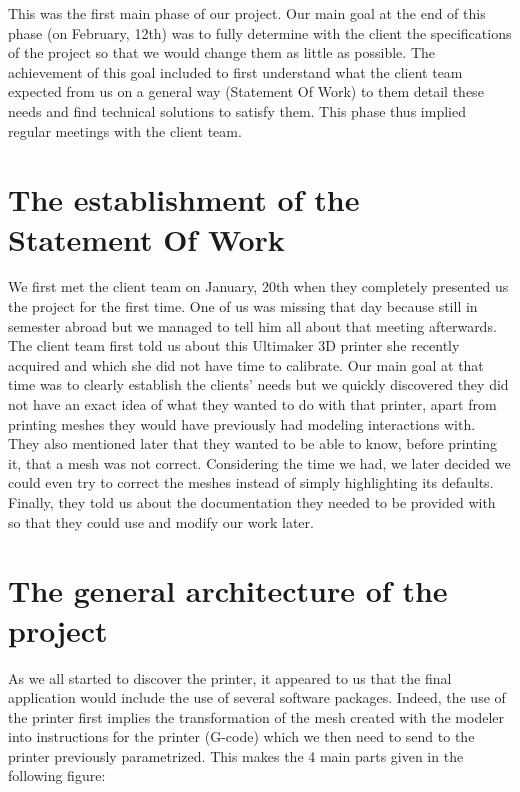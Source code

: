 \documentclass{report}
\begin{document}
This was the first main phase of our project. Our main goal at the end of this phase (on February, 12th) was to fully determine with the client the specifications of the project so that we would change them as little as possible. The achievement of this goal included to first understand what the client team expected from us on a general way (Statement Of Work) to them detail these needs and find technical solutions to satisfy them. This phase thus implied regular meetings with the client team.

\section{The establishment of the Statement Of Work}

We first met the client team on January, 20th when they completely presented us the project for the first time. One of us was missing that day because still in semester abroad but we managed to tell him all about that meeting afterwards.\\

The client team first told us about this Ultimaker 3D printer she recently acquired and which she did not have time to calibrate. Our main goal at that time was to clearly establish the clients' needs but we quickly discovered they did not have an exact idea of what they wanted to do with that printer, apart from printing meshes they would have previously had modeling interactions with.\\

They also mentioned later that they wanted to be able to know, before printing it, that a mesh was not correct. Considering the time we had, we later decided we could even try to correct the meshes instead of simply highlighting its defaults. \\

Finally, they told us about the documentation they needed to be provided with so that they could use and modify our work later. \\

\section{The general architecture of the project}

As we all started to discover the printer, it appeared to us that the final application would include the use of several software packages. Indeed, the use of the printer first implies the transformation of the mesh created with the modeler into instructions for the printer (G-code) which we then need to send to the printer previously parametrized. This makes the 4 main parts given in the following figure:
\end{document}
